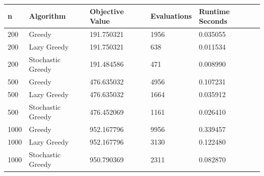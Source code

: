 \begin{tabular}{lllll}
\hline
n & Algorithm & Objective Value & Evaluations & Runtime Seconds \\
\hline
200 & Greedy & 191.750321 & 1956 & 0.035055 \\
200 & Lazy Greedy & 191.750321 & 638 & 0.011534 \\
200 & Stochastic Greedy & 191.484586 & 471 & 0.008990 \\
500 & Greedy & 476.635032 & 4956 & 0.107231 \\
500 & Lazy Greedy & 476.635032 & 1664 & 0.035912 \\
500 & Stochastic Greedy & 476.452069 & 1161 & 0.026410 \\
1000 & Greedy & 952.167796 & 9956 & 0.339457 \\
1000 & Lazy Greedy & 952.167796 & 3130 & 0.122480 \\
1000 & Stochastic Greedy & 950.790369 & 2311 & 0.082870 \\
\hline
\end{tabular}
